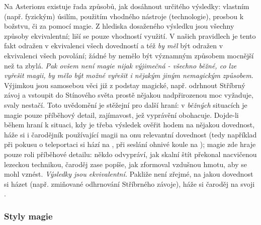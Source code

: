 \documentclass[../main.tex]{subfiles}
\begin{document}
Na Asterionu existuje řada způsobů, jak dosáhnout určitého výsledky: vlastním (např. fyzickým) úsilím, použitím vhodného nástroje (technologie), prosbou k božstvu, či za pomocí magie. Z hlediska dosaženého výsledku jsou všechny způsoby ekvivalentní; liší se pouze vhodností využití. V našich pravidlech je tento fakt odražen v ekvivalenci všech dovedností a též \emph{by měl} být odražen v ekvivalenci všech povolání; žádné by nemělo být významným způsobem mocnější než ta zbylá.  \emph{Pak ovšem není magie nijak výjimečná - všechno \emph{běžné}, co lze vyřešit magii, by mělo být možné vyřešit i \emph{nějakým jiným nemagickým způsobem}}. Výjimkou jsou samosebou věci již z podstay magické, např. odrhnout Stříbrný závoj a vstoupit do Stínového světa prostě nějakou nadpřirozenou moc vyžaduje, svaly nestačí. Toto uvědomění je stěžejní pro další hraní: v \emph{běžných} situacích je magie pouze příběhový detail, zajímavost, jež vyprávění obohacuje.
Dojde-li během hraní k situaci, kdy je třeba výsledek ověřit hodem na nějakou dovednost, háže si i čarodějník používající magii na onu relevantní dovednost (tedy například při pokusu o teleportaci si hází na , při seslání ohnivé koule na ); magie zde hraje pouze roli příběhové detailu: někdo odvypráví, jak skalní štít překonal nacvičenou lezeckou technikou, čaroděj zase popíše, jak zformoval vzdušnou hmotu, aby se mohl vznést.  \emph{Výsledky jsou ekvivalentní.} Pakliže není zřejmé, na jakou dovednost si házet (např. zmiňované odhrnování Stříbrného závoje), háže si čaroděj na svoji .

\subsubsection*{Styly magie}
\label{sec:stylymagie}
\end{document}
